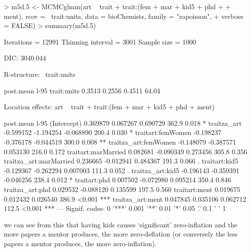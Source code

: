 \documentclass{article}
\begin{document}
\begin{Schunk}
\begin{Sinput}
> m5d.5 <- MCMCglmm(art ~ trait + trait:(fem + mar + kid5 + phd + 
+     ment), rcov = ~trait:units, data = bioChemists, family = "zapoisson", 
+     verbose = FALSE)
> summary(m5d.5)
\end{Sinput}
\begin{Soutput}
 Iterations = 12991
 Thinning interval  = 3001
 Sample size  = 1000 

 DIC: 3040.044 

 R-structure:  ~trait:units

            post.mean l-95%
trait:units    0.3513   0.2556   0.4511    64.04

 Location effects: art ~ trait + trait:(fem + mar + kid5 + phd + ment) 

                       post.mean  l-95%
(Intercept)             0.369879  0.067267  0.690729    362.9  0.018 *  
traitza_art            -0.599152 -1.194254 -0.068890    200.4  0.030 *  
traitart:femWomen      -0.198237 -0.376178 -0.044519    300.0  0.008 ** 
traitza_art:femWomen   -0.148079 -0.387571  0.053130    216.0  0.172    
traitart:marMarried     0.082681 -0.090349  0.273456    305.8  0.356    
traitza_art:marMarried  0.236665 -0.012941  0.484367    191.3  0.066 .  
traitart:kid5          -0.129367 -0.262294  0.007003    111.3  0.052 .  
traitza_art:kid5       -0.196143 -0.359391 -0.046256    238.4  0.012 *  
traitart:phd            0.007502 -0.072980  0.095214    350.4  0.846    
traitza_art:phd         0.029532 -0.088120  0.135599    197.5  0.560    
traitart:ment           0.019675  0.012432  0.026540    386.9 <0.001 ***
traitza_art:ment        0.047845  0.035106  0.062712    112.5 <0.001 ***
---
Signif. codes:  0 '***' 0.001 '**' 0.01 '*' 0.05 '.' 0.1 ' ' 1 
\end{Soutput}
\end{Schunk}

we can see from this that having kids causes `significant' zero-inflation and the more papers a mentor produces, the more zero-deflation (or conversely the less papers a mentor produces, the more zero-inflation).

\ifalone
\end{document}
